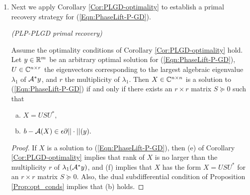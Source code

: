 \begin{enumerate}
\begin{proof}
\end{proof}

Thus $y = \Pi_\caC(y - \alpha g)$ is another optimality condition for the PLGD model (\ref{Eqn:PhaseLift-P-GD}). 


\item

Next we apply Corollary \ref{Cor:PLGD-optimality} to establish a primal recovery strategy for (\ref{Eqn:PhaseLift-P-GD}).

\begin{cor} 		\label{Cor:PLGD-primal_recovery_refinement}
\emph{(PLP-PLGD primal recovery)}

Assume the optimality conditions of Corollary \ref{Cor:PLGD-optimality} hold. Let $y \in {\mathbb R}^m$ be an arbitrary optimal solution for (\ref{Eqn:PhaseLift-P-GD}),  $U \in {\mathbb C}^{n \times r}$ the eigenvectors corresponding to the largest algebraic eigenvalue $\lambda_1$ of ${\mathcal A}^*y$, and $r$ the multiplicity of $\lambda_1$.  Then $X \in {\mathbb C}^{n \times n}$ is a solution to (\ref{Eqn:PhaseLift-P-GD}) if and only if there exists an $r \times r$ matrix $S \succeq 0$ such that
\begin{enumerate}[(a)]
\item
$X = USU^*,$
\item
$b - {\mathcal A}(X) \in \epsilon \partial ||\cdot||(y).$
\end{enumerate}
\end{cor}
\begin{proof}
If $X$ is a solution to (\ref{Eqn:PhaseLift-P-GD}), then (e) of Corollary \ref{Cor:PLGD-optimality} implies that rank of $X$ is no larger than the multiplicity $r$ of $\lambda_1({\mathcal A}^*y)$, and (f) implies that $X$ has the form $X = USU^*$ for an $r \times r$ matrix $S \succeq 0$.  Also, the dual subdifferential condition of Proposition \ref{Prop:opt_conds} implies that (b) holds.


\end{proof}
\end{enumerate}
